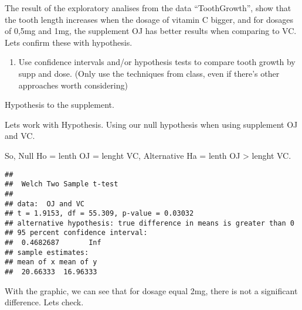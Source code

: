 \documentclass[]{article}
\newenvironment{Shaded}{\begin{snugshade}}{\end{snugshade}}
\newcommand{\DataTypeTok}[1]{\textcolor[rgb]{0.13,0.29,0.53}{#1}}
\newcommand{\FloatTok}[1]{\textcolor[rgb]{0.00,0.00,0.81}{#1}}
\newcommand{\KeywordTok}[1]{\textcolor[rgb]{0.13,0.29,0.53}{\textbf{#1}}}
\newcommand{\NormalTok}[1]{#1}
\newcommand{\OperatorTok}[1]{\textcolor[rgb]{0.81,0.36,0.00}{\textbf{#1}}}
\newcommand{\OtherTok}[1]{\textcolor[rgb]{0.56,0.35,0.01}{#1}}
\newcommand{\StringTok}[1]{\textcolor[rgb]{0.31,0.60,0.02}{#1}}
\providecommand{\tightlist}{%
  \setlength{\itemsep}{0pt}\setlength{\parskip}{0pt}}
\begin{document}
The result of the exploratory analises from the data ``ToothGrowth'',
show that the tooth length increases when the dosage of vitamin C
bigger, and for dosages of 0,5mg and 1mg, the supplement OJ has better
results when comparing to VC. Lets confirm these with hypothesis.

\begin{enumerate}
\def\labelenumi{\arabic{enumi}.}
\setcounter{enumi}{2}
\tightlist
\item
  Use confidence intervals and/or hypothesis tests to compare tooth
  growth by supp and dose. (Only use the techniques from class, even if
  there's other approaches worth considering)
\end{enumerate}

Hypothesis to the supplement.

Lets work with Hypothesis. Using our null hypothesis when using
supplement OJ and VC.

So, Null Ho = lenth OJ = lenght VC, Alternative Ha = lenth OJ
\textgreater{} lenght VC.

\begin{Shaded}
\end{Shaded}

\begin{verbatim}
## 
##  Welch Two Sample t-test
## 
## data:  OJ and VC
## t = 1.9153, df = 55.309, p-value = 0.03032
## alternative hypothesis: true difference in means is greater than 0
## 95 percent confidence interval:
##  0.4682687       Inf
## sample estimates:
## mean of x mean of y 
##  20.66333  16.96333
\end{verbatim}

With the graphic, we can see that for dosage equal 2mg, there is not a
significant difference. Lets check.
\end{document}
